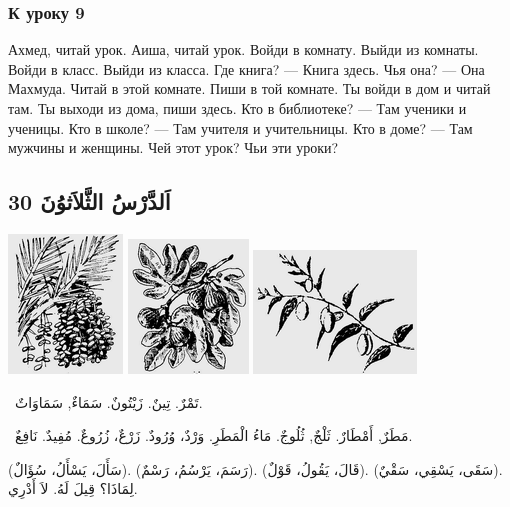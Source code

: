 \documentclass[a5paper]{article}
\begin{document}
\subsubsection{К уроку 9}
Ахмед, читай урок. Аиша, читай урок. Войди в комнату. Выйди из комнаты. Войди в класс. Выйди из класса. Где книга? — Книга здесь. Чья она? — Она Махмуда. Читай в этой комнате. Пиши в той комнате. Ты войди в дом и читай там. Ты выходи из дома, пиши здесь. Кто в библиотеке? — Там ученики и ученицы. Кто в школе? — Там учителя и учительницы. Кто в доме? — Там мужчины и женщины. Чей этот урок? Чьи эти уроки?

\subsection{30 اَلدَّرْسُ الثَّلاَثوُنَ}
 \includegraphics[width=1.198in,height=1.4583in]{images/MuhammadBagauddinprettified-img060.png}  \includegraphics[width=1.2602in,height=1.4063in]{images/MuhammadBagauddinprettified-img061.png}   \includegraphics[width=1.7083in,height=1.2917in]{images/MuhammadBagauddinprettified-img062.png} 

\ تَمْرٌ. تِينٌ. زَيْتُونٌ. سَمَاءٌ, سَمَاوَاتٌ.

\ مَطَرٌ, أَمْطَارٌ. ثَلْجٌ, ثُلُوجٌ. مَاءُ الْمَطَرِ. وَرْدٌ، وُرُودٌ. زَرْعٌ، زُرُوعٌ. مُفِيدٌ. نَافِعٌ.

(سَأَلَ، يَسْأَلُ، سُؤَالٌ). (رَسَمَ، يَرْسُمُ، رَسْمٌ). (قَالَ، يَقُولُ، قَوْلٌ). (سَقَى، يَسْقِي، سَقْيٌ). لِمَاذَا؟ قِيلَ لَهُ. لاَ أَدْرِي.
\end{document}
